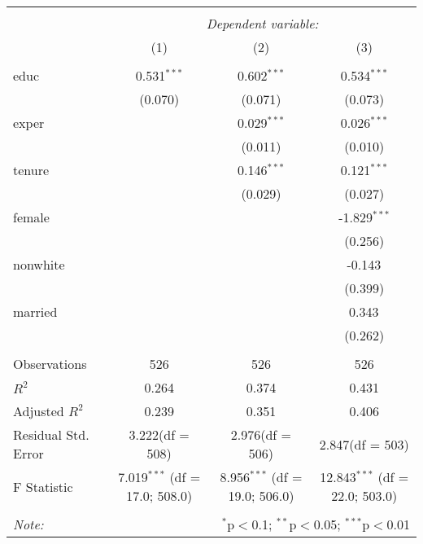 \begin{table}[!htbp] \centering
\begin{tabular}{@{\extracolsep{5pt}}lccc}
\\[-1.8ex]\hline
\hline \\[-1.8ex]
& \multicolumn{3}{c}{\textit{Dependent variable:}} \
\cr \cline{3-4}
\\[-1.8ex] & (1) & (2) & (3) \\
\hline \\[-1.8ex]
 educ & 0.531$^{***}$ & 0.602$^{***}$ & 0.534$^{***}$ \\
  & (0.070) & (0.071) & (0.073) \\
 exper & & 0.029$^{***}$ & 0.026$^{***}$ \\
  & & (0.011) & (0.010) \\
 tenure & & 0.146$^{***}$ & 0.121$^{***}$ \\
  & & (0.029) & (0.027) \\
 female & & & -1.829$^{***}$ \\
  & & & (0.256) \\
 nonwhite & & & -0.143$^{}$ \\
  & & & (0.399) \\
 married & & & 0.343$^{}$ \\
  & & & (0.262) \\
\hline \\[-1.8ex]
 Observations & 526 & 526 & 526 \\
 $R^2$ & 0.264 & 0.374 & 0.431 \\
 Adjusted $R^2$ & 0.239 & 0.351 & 0.406 \\
 Residual Std. Error & 3.222(df = 508) & 2.976(df = 506) & 2.847(df = 503)  \\
 F Statistic & 7.019$^{***}$ (df = 17.0; 508.0) & 8.956$^{***}$ (df = 19.0; 506.0) & 12.843$^{***}$ (df = 22.0; 503.0) \\
\hline
\hline \\[-1.8ex]
\textit{Note:} & \multicolumn{3}{r}{$^{*}$p$<$0.1; $^{**}$p$<$0.05; $^{***}$p$<$0.01} \\
\end{tabular}
\end{table}